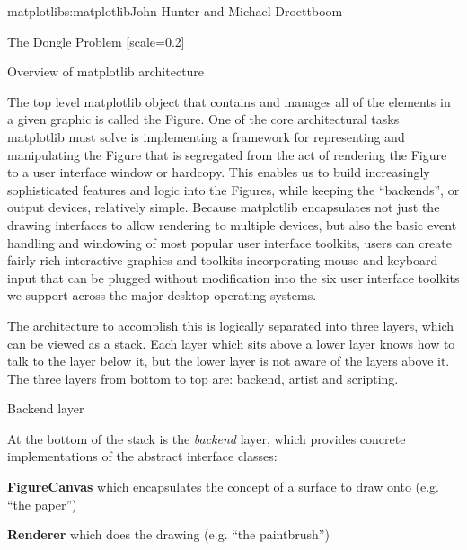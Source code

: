 \begin{aosachapter}{matplotlib}{s:matplotlib}{John Hunter and Michael Droettboom}
\begin{aosasect1}{The Dongle Problem}
[scale=0.2]
\end{aosasect1}

\begin{aosasect1}{Overview of matplotlib architecture}


The top level matplotlib object that contains and manages all of the
elements in a given graphic is called the Figure.  One of the core
architectural tasks matplotlib must solve is implementing a framework
for representing and manipulating the Figure that is segregated from
the act of rendering the Figure to a user interface window or
hardcopy.  This enables us to build increasingly sophisticated
features and logic into the Figures, while keeping the ``backends'', or
output devices, relatively simple.  Because matplotlib encapsulates
not just the drawing interfaces to allow rendering to multiple
devices, but also the basic event handling and windowing of most
popular user interface toolkits, users can create fairly rich
interactive graphics and toolkits incorporating mouse and keyboard
input that can be plugged without modification into the six user
interface toolkits we support across the major desktop operating
systems.

The architecture to accomplish this is logically separated into three
layers, which can be viewed as a stack.  Each layer which sits above a
lower layer knows how to talk to the layer below it, but the lower
layer is not aware of the layers above it.  The three layers from
bottom to top are: backend, artist and scripting.


\begin{aosasect2}{Backend layer}

At the bottom of the stack is the \emph{backend} layer, which provides
concrete implementations of the abstract interface classes:
\begin{aosaitemize}
\item \textbf{FigureCanvas} which encapsulates the concept of
  a surface to draw onto (e.g. ``the paper'')

\item \textbf{Renderer} which does the drawing (e.g. ``the paintbrush'')


\end{aosaitemize}
\end{aosasect2}
\end{aosasect1}
\end{aosachapter}
